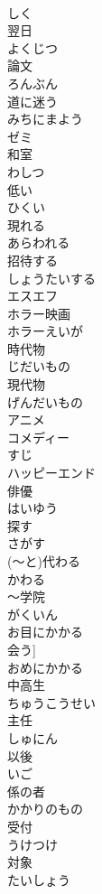 \documentclass[8pt]{extreport}
\begin{document}
\begin{CJK}{UTF8}{min}
\\	しく
\\	翌日	
\\	よくじつ
\\	論文	
\\	ろんぶん
\\	道に迷う	
\\	みちにまよう
\\	ゼミ	
\\	和室	
\\	わしつ
\\	低い	
\\	ひくい
\\	現れる	
\\	あらわれる
\\	招待する	
\\	しょうたいする
\\	エスエフ
\\	ホラー映画	
\\	ホラーえいが
\\	時代物	
\\	じだいもの
\\	現代物	
\\	げんだいもの
\\	アニメ	
\\	コメディー	
\\	すじ	
\\	ハッピーエンド	
\\	俳優	
\\	はいゆう
\\	探す	
\\	さがす
\\	(～と)代わる	
\\	かわる
\\	～学院	
\\	がくいん
\\	お目にかかる	
\\	会う] 
\\	おめにかかる
\\	中高生	
\\	ちゅうこうせい
\\	主任	
\\	しゅにん
\\	以後	
\\	いご
\\	係の者	
\\	かかりのもの
\\	受付	
\\	うけつけ
\\	対象	
\\	たいしょう

\end{CJK}
\end{document}
